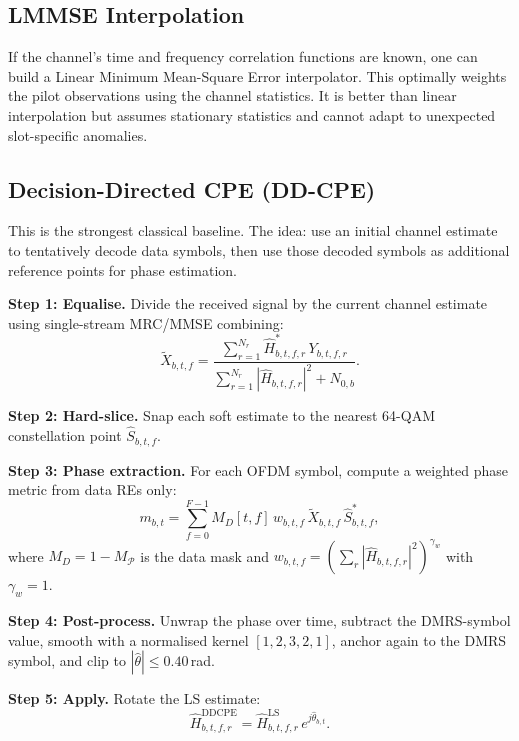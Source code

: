 \documentclass[11pt,a4paper]{article}
\begin{document}
	\subsection{LMMSE Interpolation}
	
	If the channel's time and frequency correlation functions are known, one can build a Linear Minimum Mean-Square Error interpolator.  This optimally weights the pilot observations using the channel statistics.  It is better than linear interpolation but assumes stationary statistics and cannot adapt to unexpected slot-specific anomalies.
	
	\subsection{Decision-Directed CPE (DD-CPE)}
	\label{sec:ddcpe}
	
	This is the strongest classical baseline.  The idea: use an initial channel estimate to tentatively decode data symbols, then use those decoded symbols as additional reference points for phase estimation.
	
	\textbf{Step 1: Equalise.}  Divide the received signal by the current channel estimate using single-stream MRC/MMSE combining:
	\begin{equation}
		\widetilde{X}_{b,t,f} = \frac{\sum_{r=1}^{N_r} \widehat{H}^*_{b,t,f,r}\, Y_{b,t,f,r}}{\sum_{r=1}^{N_r} |\widehat{H}_{b,t,f,r}|^2 + N_{0,b}}.
		\label{eq:ddcpe_eq}
	\end{equation}
	
	\textbf{Step 2: Hard-slice.}  Snap each soft estimate to the nearest 64-QAM constellation point $\widehat{S}_{b,t,f}$.
	
	\textbf{Step 3: Phase extraction.}  For each OFDM symbol, compute a weighted phase metric from data REs only:
	\begin{equation}
		m_{b,t} = \sum_{f=0}^{F-1} M_D[t,f]\, w_{b,t,f}\, \widetilde{X}_{b,t,f}\, \widehat{S}^*_{b,t,f},
		\label{eq:ddcpe_phase}
	\end{equation}
	where $M_D = 1 - M_\mathcal{P}$ is the data mask and $w_{b,t,f} = (\sum_r |\widehat{H}_{b,t,f,r}|^2)^{\gamma_w}$ with $\gamma_w = 1$.
	
	\textbf{Step 4: Post-process.}  Unwrap the phase over time, subtract the DMRS-symbol value, smooth with a normalised kernel $[1,2,3,2,1]$, anchor again to the DMRS symbol, and clip to $|\hat{\theta}| \leq 0.40$\,rad.
	
	\textbf{Step 5: Apply.}  Rotate the LS estimate:
	\begin{equation}
		\widehat{H}^{\mathrm{DDCPE}}_{b,t,f,r} = \widehat{H}^{\mathrm{LS}}_{b,t,f,r}\, e^{j\hat{\theta}_{b,t}}.
	\end{equation}
	
\end{document}
